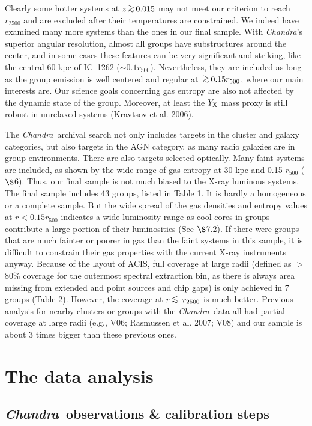 \documentclass{aastex}
\newcommand{\lsim}{\mbox{\hspace{.2em}\raisebox{.5ex}{$<$}\hspace{-.8em}\raisebox{-.5ex}{$\sim$}
\hspace{.2em}}}
\newcommand{\gsim}{\mbox{\hspace{.2em}\raisebox{.5ex}{$>$}\hspace{-.8em}\raisebox{-.5ex}{$\sim$}\hspace{.2em}}}
\def\chandra    {{\em Chandra}\/}
\begin{document}
Clearly some hotter systems at $z\gsim0.015$ may not meet our criterion to reach
$r_{2500}$ and are excluded after their temperatures are constrained.
We indeed have examined many more systems than the ones in our final sample.
With \chandra's superior angular resolution, almost all groups have substructures
around the center, and in some cases these features can be very significant and
striking, like the central 60 kpc of IC~1262 ($\sim 0.1 r_{500}$).
Nevertheless, they are included as long as the group emission is well centered
and regular at $\gsim 0.15 r_{500}$, where our main interests are.
Our science goals concerning gas entropy are also not affected by the dynamic state of the
group. Moreover, at least the $Y_{\rm X}$ mass proxy is still robust in unrelaxed systems
(Kravtsov et al. 2006).

The \chandra\ archival search not only includes targets in the cluster and galaxy
categories, but also targets in the AGN category, as many radio galaxies are in
group environments. There are also targets selected optically. Many faint
systems are included, as shown by the wide range of gas entropy at 30 kpc and
0.15 $r_{500}$ ($\S$6). Thus, our final sample is not much biased to the X-ray
luminous systems. The final sample includes 43 groups, listed in Table 1.
It is hardly a homogeneous or a complete sample. But the wide spread of the gas
densities and entropy values
at $r < 0.15 r_{500}$ indicates a wide luminosity range as cool cores in groups contribute
a large portion of their luminosities (See $\S$7.2).
If there were groups that are much fainter or poorer in gas than the faint systems in this sample,
it is difficult to constrain their gas properties with the current
X-ray instruments anyway. Because of the layout of ACIS, full
coverage at large radii (defined as $>$ 80\% coverage for the outermost spectral
extraction bin, as there is always area missing from extended and point sources and chip gaps)
is only achieved in 7 groups (Table 2).
However, the coverage at $r \lsim r_{2500}$ is much better. Previous analysis
for nearby clusters or groups with the \chandra\ data all had partial
coverage at large radii (e.g., V06; Rasmussen et al. 2007; V08) and our sample
is about 3 times bigger than these previous ones.

\section{The data analysis}

\subsection{\chandra\ observations \& calibration steps}
\end{document}
